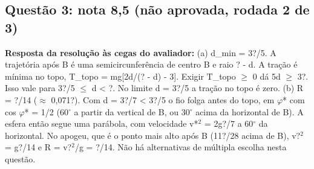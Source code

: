 \documentclass{article}%
\begin{document}
\subsection*{Questão 3: nota 8,5 (não aprovada, rodada 2 de 3)}%
\textbf{Resposta da resolução às cegas do avaliador:} (a) d\_min = 3?/5. A trajetória após B é uma semicircunferência de centro B e raio ? - d. A tração é mínima no topo, T\_topo = mg{[}2d/(? - d) - 3{]}. Exigir T\_topo $\geq$ 0 dá 5d $\geq$ 3?. Isso vale para 3?/5 $\leq$ d < ?. No limite d = 3?/5 a tração no topo é zero.\newline%
\newline%
(b) R = ?/14 ($\approx$ 0,071?). Com d = 3?/7 < 3?/5 o fio folga antes do topo, em $\varphi$* com cos $\varphi$* = 1/2 (60$^\circ$ a partir da vertical de B, ou 30$^\circ$ acima da horizontal de B). A esfera então segue uma parábola, com velocidade v*$^2$ = 2g?/7 a 60$^\circ$ da horizontal. No apogeu, que é o ponto mais alto após B (11?/28 acima de B), v?$^2$ = g?/14 e R = v?$^2$/g = ?/14.\newline%
\newline%
Não há alternativas de múltipla escolha nesta questão.\par %
\end{document}
